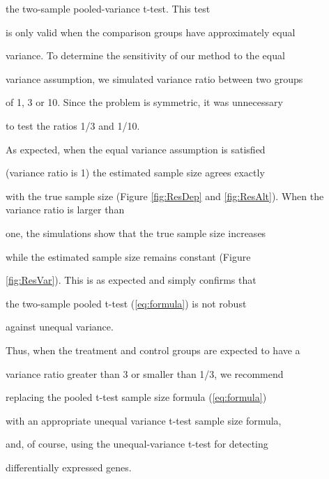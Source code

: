 \documentclass[12pt]{article}
\begin{document}
the two-sample pooled-variance t-test.  This test

is only valid when the comparison groups have approximately equal

variance. To determine the sensitivity of our method to the equal

variance assumption, we simulated variance ratio between two groups

of 1, 3 or 10.  Since the problem is symmetric, it was unnecessary

to test the ratios 1/3 and 1/10.



As expected, when the equal variance assumption is satisfied

(variance ratio is 1) the estimated sample size agrees exactly

with the true sample size (Figure \ref{fig:ResDep} and
\ref{fig:ResAlt}). When the variance ratio is larger than

one, the simulations show that the true sample size increases

while the estimated sample size remains constant (Figure

\ref{fig:ResVar}).   This is as expected and simply confirms that

the two-sample pooled t-test (\ref{eq:formula}) is not robust

against unequal variance.



Thus, when the treatment and control groups are expected to have a

variance ratio greater than 3 or smaller than 1/3, we recommend

replacing the pooled t-test sample size formula (\ref{eq:formula})

with an appropriate unequal variance t-test sample size formula,

and, of course, using the unequal-variance t-test for detecting

differentially expressed genes.
\end{document}
